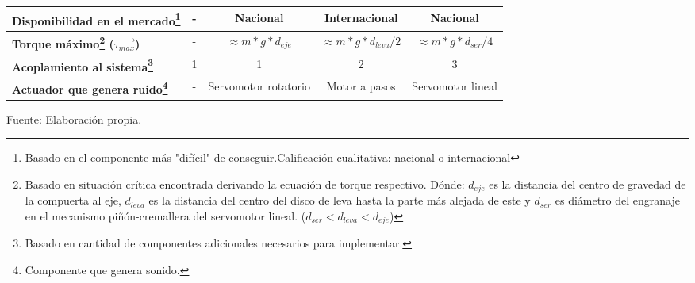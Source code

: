 \begin{itemize}
\begin{savenotes}
\begin{mytable}[H]
\begin{tabular}{l|c|c|c|c|}
				\multicolumn{1}{|l|}{
					\begin{minipage}{\myforthmaxsizeofcontenttable}			
						\textbf{Disponibilidad en el mercado\footnote{Basado en el componente más "difícil" de conseguir.Calificación cualitativa: nacional o internacional}}
					\end{minipage}
				} & - & Nacional & Internacional & Nacional \\ \hline
				\multicolumn{1}{|l|}{
					\begin{minipage}{\myforthmaxsizeofcontenttable}			
						\textbf{Torque máximo\footnote{Basado en situación crítica encontrada derivando la ecuación de torque respectivo. Dónde: $d_{eje}$ es la distancia del centro de gravedad de la compuerta al eje, $d_{leva}$ es la distancia del centro del disco de leva hasta la parte más alejada de este y $d_{ser}$ es diámetro del engranaje en el mecanismo piñón-cremallera del servomotor lineal. ($d_{ser}<d_{leva}<d_{eje}$)} ($\overrightarrow{\tau_{max}}$)}	
					\end{minipage}
				} & - & $\approx m*g*d_{eje}$ & $\approx m*g*d_{leva}/2$ & $\approx m*g*d_{ser}/4$ \\ \hline
				\multicolumn{1}{|l|}{
					\begin{minipage}{\myforthmaxsizeofcontenttable}			
						\textbf{Acoplamiento al sistema\footnote{Basado en cantidad de componentes adicionales necesarios para implementar. }}
					\end{minipage}
				} & 1 & 1 & 2 & 3 \\ \hline
				\multicolumn{1}{|l|}{
					\begin{minipage}{\myforthmaxsizeofcontenttable}			
						\textbf{Actuador que genera ruido\footnote{Componente que genera sonido.}}
					\end{minipage}
				} & - & Servomotor rotatorio & Motor a pasos & Servomotor lineal \\ \hline
			\end{tabular}
			\begin{myflushcenteraftertable}	
				Fuente: Elaboración propia.
			\end{myflushcenteraftertable}
		\end{mytable}
	\end{savenotes}	
	

\end{itemize}
